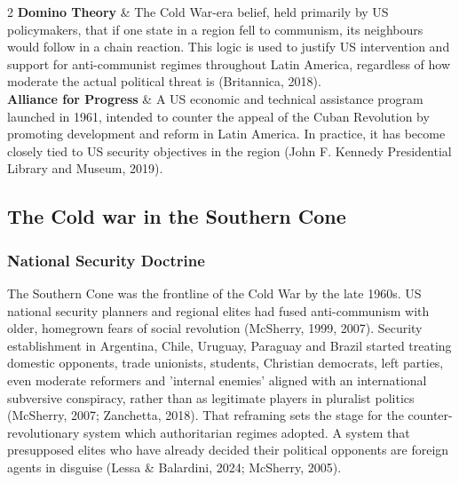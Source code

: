 \begin{guidetable}[Y{0.45}Y{1.55}]{2}
  \midrule
  \textbf{Domino Theory} & The Cold War-era belief, held primarily by US policymakers, that if one state in a region fell to communism, its neighbours would follow in a chain reaction. This logic is used to justify US intervention and support for anti-communist regimes throughout Latin America, regardless of how moderate the actual political threat is (Britannica, 2018). \\
  \midrule
  \textbf{Alliance for Progress} & A US economic and technical assistance program launched in 1961, intended to counter the appeal of the Cuban Revolution by promoting development and reform in Latin America. In practice, it has become closely tied to US security objectives in the region (John F. Kennedy Presidential Library and Museum, 2019). \\
\end{guidetable}

\subsection{The Cold war in the Southern Cone}

\subsubsection{National Security Doctrine}

The Southern Cone was the frontline of the Cold War by the late 1960s. US national security planners and regional elites had fused anti-communism with older, homegrown fears of social revolution (McSherry, 1999, 2007). Security establishment in Argentina, Chile, Uruguay, Paraguay and Brazil started treating domestic opponents, trade unionists, students, Christian democrats, left parties, even moderate reformers and 'internal enemies’ aligned with an international subversive conspiracy, rather than as legitimate players in pluralist politics (McSherry, 2007; Zanchetta, 2018). That reframing sets the stage for the counter-revolutionary system which authoritarian regimes adopted. A system that presupposed elites who have already decided their political opponents are foreign agents in disguise (Lessa \& Balardini, 2024; McSherry, 2005).

